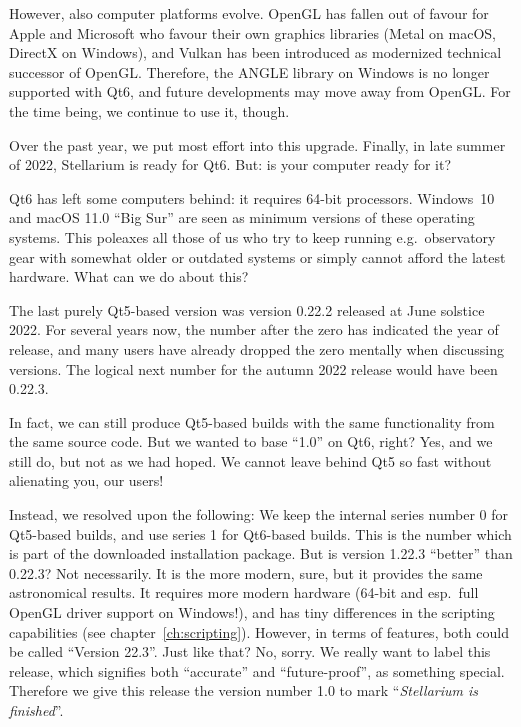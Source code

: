 However, also computer platforms evolve. OpenGL has fallen out of
favour for Apple and Microsoft who favour their own graphics
libraries (Metal on macOS, DirectX on Windows), and Vulkan has been
introduced as modernized technical
successor of OpenGL. Therefore, the ANGLE library on Windows is no
longer supported with Qt6, and future developments may move away from
OpenGL. For the time being, we continue to use it, though.

Over the past year, we put most effort into this upgrade. Finally, in
late summer of 2022, Stellarium is ready for Qt6. But: is your computer
ready for it?

Qt6 has left some computers behind: it requires 64-bit processors.
Windows~10 and macOS 11.0 ``Big Sur'' are seen as minimum versions of
these operating systems. This poleaxes all those of us who try to keep
running e.g.\ observatory gear with somewhat older or outdated systems
or simply cannot afford the latest hardware.  What can we do about
this?

The last purely Qt5-based version was version 0.22.2 released at June
solstice 2022. For several years now, the number after the zero has
indicated the year of release, and many users have already dropped the
zero mentally when discussing versions.  The logical next number for
the autumn 2022 release would have been 0.22.3.

In fact, we can still produce Qt5-based builds with the same
functionality from the same source code. But we wanted to base ``1.0''
on Qt6, right? Yes, and we still do, but not as we had hoped. We
cannot leave behind Qt5 so fast without alienating you, our users!

Instead, we resolved upon the following: We keep the internal series
number 0 for Qt5-based builds, and use series 1 for Qt6-based
builds. This is the number which is part of the downloaded
installation package.  But is version 1.22.3 ``better'' than 0.22.3?
Not necessarily. It is the more modern, sure, but it provides the same
astronomical results. It requires more modern hardware (64-bit and
esp.\ full OpenGL driver support on Windows!), and has tiny
differences in the scripting capabilities (see
chapter~\ref{ch:scripting}). However, in terms of features, both could
be called ``Version 22.3''. Just like that? No, sorry.
We really want to label this release, which signifies both ``accurate'' and
``future-proof'', as something special. Therefore we give this release
the version number 1.0 to mark ``\emph{Stellarium is finished}''.

